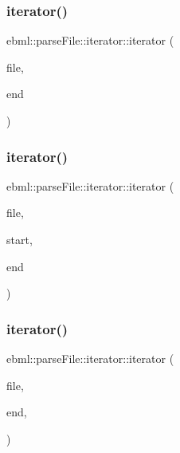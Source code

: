 \subsubsection{\texorpdfstring{iterator()}{iterator()}\hspace{0.1cm}{\footnotesize\ttfamily [2/10]}}
{\footnotesize\ttfamily ebml\+::parse\+File\+::iterator\+::iterator (\begin{DoxyParamCaption}\item[{\mbox{\hyperlink{classebml_1_1ioBase}{io\+Base}} $\ast$}]{file,  }\item[{off\+\_\+t}]{end }\end{DoxyParamCaption})}

\mbox{\label{classebml_1_1parseFile_1_1iterator_a4b498f07c0bc4cf2ef05472ab7515508}} 
\subsubsection{\texorpdfstring{iterator()}{iterator()}\hspace{0.1cm}{\footnotesize\ttfamily [3/10]}}
{\footnotesize\ttfamily ebml\+::parse\+File\+::iterator\+::iterator (\begin{DoxyParamCaption}\item[{\mbox{\hyperlink{classebml_1_1ioBase}{io\+Base}} $\ast$}]{file,  }\item[{off\+\_\+t}]{start,  }\item[{off\+\_\+t}]{end }\end{DoxyParamCaption})}

\mbox{\label{classebml_1_1parseFile_1_1iterator_af5038abb12db4272932c0da3008e6520}} 
\subsubsection{\texorpdfstring{iterator()}{iterator()}\hspace{0.1cm}{\footnotesize\ttfamily [4/10]}}
{\footnotesize\ttfamily ebml\+::parse\+File\+::iterator\+::iterator (\begin{DoxyParamCaption}\item[{\mbox{\hyperlink{classebml_1_1ioBase}{io\+Base}} $\ast$}]{file,  }\item[{off\+\_\+t}]{end,  }\item[{\mbox{\hyperlink{classebml_1_1parseFile}{parse\+File}} \&}]{ }\end{DoxyParamCaption})}

